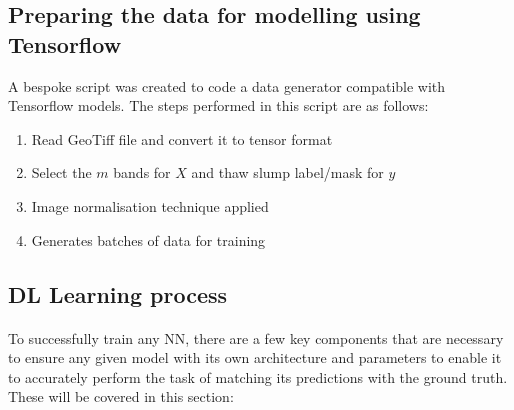 \subsection{Preparing the data for modelling using Tensorflow} \label{tf_dataprep}
A bespoke script was created to code a data generator compatible with Tensorflow models. The steps performed in this script are as follows:

\begin{enumerate}
    \item Read GeoTiff file and convert it to tensor format
    \item Select the $m$ bands for $X$ and thaw slump label/mask for $y$
    \item Image normalisation technique applied
    \item Generates batches of data for training
\end{enumerate}
\subsection{\gls{DL} Learning process} \label{nn_hyperparameters}
\paragraph{}
To successfully train any \gls{NN}, there are a few key components that are necessary to ensure any given model with its own architecture and parameters to enable it to accurately perform the task of matching its predictions with the ground truth. These will be covered in this section:

